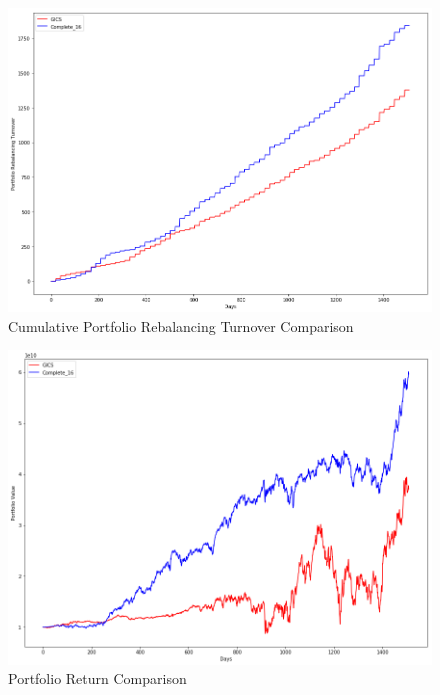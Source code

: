 \documentclass[../main.tex]{subfiles}
\begin{document}
\begin{figure}[H]
    \centering
    \includegraphics[scale=0.4]{images/port_rebal_turnover_compare.png}
    \caption{Cumulative Portfolio Rebalancing Turnover Comparison}
    \label{fig:benchmark_comparison:rebal_turnover_comparison}
\end{figure}

\begin{figure}[H]
    \centering
    \includegraphics[scale=0.4]{images/port_value_compare.png}
    \caption{Portfolio Return Comparison}
    \label{fig:benchmark_comparison:retuern_comparison}
\end{figure}
\end{document}
